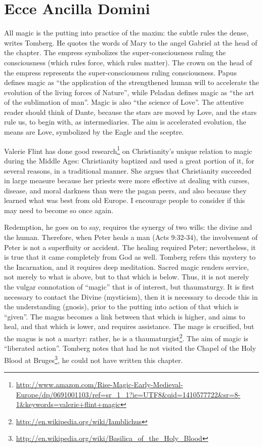 \section{Ecce Ancilla Domini}

All magic is the putting into practice of the maxim: the subtle rules the dense, writes Tomberg. He quotes the words of Mary to the angel Gabriel at the head of the chapter. The empress symbolizes the super-consciousness ruling the consciousness (which rules force, which rules matter). The crown on the head of the empress represents the super-consciousness ruling consciousness. Papus defines magic as ``the application of the strengthened human will to accelerate the evolution of the living forces of Nature'', while Peladan defines magic as ``the art of the sublimation of man''. Magic is also ``the science of Love''. The attentive reader should think of Dante, because the stars are moved by Love, and the stars rule us, to begin with, as intermediaries. The aim is accelerated evolution, the means are Love, symbolized by the Eagle and the sceptre.

Valerie Flint has done good research\footnote{\url{http://www.amazon.com/Rise-Magic-Early-Medieval-Europe/dp/0691001103/ref=sr\_1\_1?ie=UTF8&qid=1410577722&sr=8-1&keywords=valerie+flint+magic}} on Christianity's unique relation to magic during the Middle Ages: Christianity baptized and used a great portion of it, for several reasons, in a traditional manner. She argues that Christianity succeeded in large measure because her priests were more effective at dealing with curses, disease, and moral darkness than were the pagan peers, and also because they learned what was best from old Europe. I encourage people to consider if this may need to become so once again.

Redemption, he goes on to say, requires the synergy of two wills: the divine and the human. Therefore, when Peter heals a man (Acts 9:32-34), the involvement of Peter is not a superfluity or accident. The healing required Peter; nevertheless, it is true that it came completely from God as well. Tomberg refers this mystery to the Incarnation, and it requires deep meditation. Sacred magic renders service, not merely to what is above, but to that which is below. Thus, it is not merely the vulgar connotation of ``magic'' that is of interest, but thaumaturgy. It is first necessary to contact the Divine (mysticism), then it is necessary to decode this in the understanding (gnosis), prior to the putting into action of that which is ``given''. The magus becomes a link between that which is higher, and aims to heal, and that which is lower, and requires assistance. The mage is crucified, but the magus is not a martyr: rather, he is a thaumaturgist\footnote{\url{http://en.wikipedia.org/wiki/Iamblichus}}. The aim of magic is ``liberated action''. Tomberg notes that had he not visited the Chapel of the Holy Blood at Bruges\footnote{\url{http://en.wikipedia.org/wiki/Basilica\_of\_the\_Holy\_Blood}}, he could not have written this chapter.

